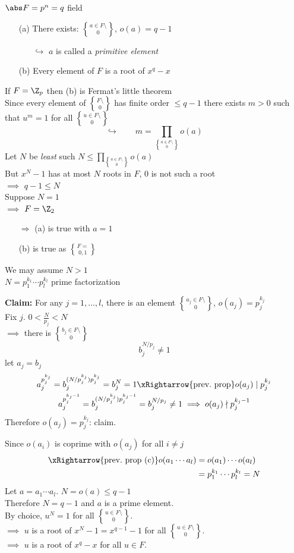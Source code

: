 \thm $\abs F=p^n=q$ field
\begin{enumerate}
\item[(a)] There exists: $a\in F\setminus\brace0$, $o(a)=q-1$
\begin{itemize}
\item[$\hookrightarrow$] $a$ is called a \emph{primitive element}
\end{itemize}
\item[(b)] Every element of $F$ is a root of $x^q-x$
\end{enumerate}
\remark If $F=\Z_p$ then (b) is Fermat's little theorem \\
\pf Since every element of $F\setminus\brace0$ has finite order $\leq q-1$ there exists $m>0$ such that $u^m=1$ for all $u\in F\setminus\brace0$
\[ \hookrightarrow \qquad m = \prod_{a\in F\setminus\brace0}o(a) \]
Let $N$ be \emph{least} such $N\leq\prod_{a\in F\setminus\brace0}o(a)$ \\
But $x^N-1$ has at most $N$ roots in $F$, $0$ is not such a root \\
$\implies$ $q-1\leq N$ \\
Suppose $N=1$ \\
$\implies$ $F=\Z_2$
\begin{enumerate}
\item[$\Longrightarrow$ (a)] is true with $a=1$
\item[(b)] is true as $F=\brace{0,1}$
\end{enumerate}
We may assume $N>1$ \\
$N=p_1^{k_1}\dotsm p_l^{k_l}$ prime factorization

\textbf{Claim: }For any $j=1,\dotsc,l$, there is an element $a_j\in F\setminus\brace0$, $o(a_j)=p_j^{k_j}$ \\
\pf Fix $j$.  $0<\frac{N}{p_j}<N$ \\
$\implies$ there is $b_j\in F\setminus\brace0$
\[ b_j^{N/p_j} \neq 1 \]
let $a_j=b_j$
\begin{gather*}
a_j^{p_j^{k_j}} = b_j^{(N/p_j^{k_j})p_j^{k_j}} = b_j^N = 1 \xRightarrow{\text{prev.~prop}} o(a_j)\mid p_j^{k_j} \\
a_j^{p_j^{k_j-1}} = b_j^{(N/p_j^{k_j})p_j^{k_j-1}} = b_j^{N/p_j} \neq 1 \implies o(a_j) \nmid p_j^{k_j-1}
\end{gather*}
Therefore $o(a_j)=p_j^{k_j}$: claim.

Since $o(a_i)$ is coprime with $o(a_j)$ for all $i\neq j$
\begin{align*}
\xRightarrow{\text{prev.~prop (c)}} o(a_1\dotsm a_l) &= o(a_1)\dotsm o(a_l) \\
&= p_1^{k_1}\dotsm p_l^{k_l} = N
\end{align*}
Let $a=a_1\dotsm a_l$.  $N=o(a)\leq q-1$ \\
Therefore $N=q-1$ and $a$ is a prime element. \\
By choice, $u^N=1$ for all $u\in F\setminus\brace0$. \\
$\implies$ $u$ is a root of $x^N-1=x^{q-1}-1$ for all $u\in F\setminus\brace0$. \\
$\implies$ $u$ is a root of $x^q-x$ for all $u\in F$.

